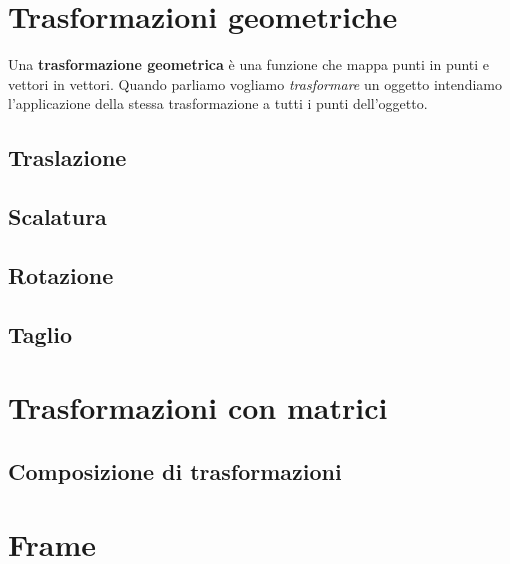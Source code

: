 \section{Trasformazioni geometriche}
Una \textbf{trasformazione geometrica} \`e una funzione che mappa punti in punti e vettori
in vettori. Quando parliamo vogliamo \emph{trasformare} un oggetto intendiamo l'applicazione
della stessa trasformazione a tutti i punti dell'oggetto.

\subsection{Traslazione}

\subsection{Scalatura}

\subsection{Rotazione}

\subsection{Taglio}

\section{Trasformazioni con matrici}

\subsection{Composizione di trasformazioni}

\section{Frame}
